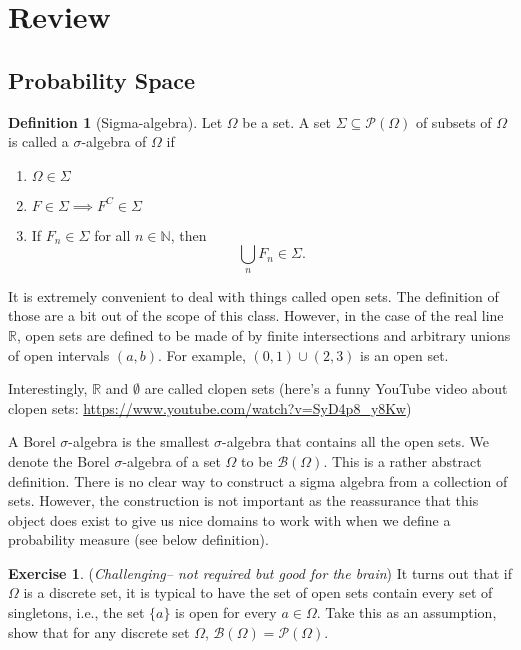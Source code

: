 \documentclass[
  openany]{book}
\theoremstyle{definition}
\newtheorem{definition}{Definition}[chapter]
\theoremstyle{definition}
\theoremstyle{definition}
\newtheorem{exercise}{Exercise}[chapter]
\theoremstyle{definition}
\theoremstyle{remark}
\begin{document}
\section{Review}\label{review}

\subsection{Probability Space}\label{probability-space}

\begin{definition}[Sigma-algebra]

Let \(\Omega\) be a set.
A set \(\Sigma \subseteq \mathcal{P}(\Omega)\) of subsets of \(\Omega\) is called a \(\sigma\)-algebra
of \(\Omega\) if

\begin{enumerate}
\def\labelenumi{\arabic{enumi}.}
\item
  \(\Omega\in \Sigma\)
\item
  \(F \in \Sigma \implies F^C \in \Sigma\)
\item
  If \(F_n \in \Sigma\) for all \(n\in \mathbb{N}\), then
  \[ \bigcup_n F_n \in \Sigma .\]
\end{enumerate}

\end{definition}

It is extremely convenient to deal with things called open sets.
The definition of those are a bit out of the scope of this class.
However,
in the case of the real line \(\mathbb{R}\), open sets are defined to be made of by finite intersections and arbitrary unions of open intervals \((a,b)\).
For example, \((0,1)\cup (2,3)\) is an open set.

Interestingly, \(\mathbb{R}\) and \(\emptyset\) are called clopen sets (here's a funny YouTube video about clopen sets: \url{https://www.youtube.com/watch?v=SyD4p8_y8Kw})

A Borel \(\sigma\)-algebra is the smallest \(\sigma\)-algebra that contains all the open sets.
We denote the Borel \(\sigma\)-algebra of a set \(\Omega\) to be \(\mathcal{B}(\Omega)\).
This is a rather abstract definition. There is no clear way to construct a sigma algebra from a collection of sets. However, the construction is not important as the reassurance that this object does exist to give us nice domains to work with when we define a probability measure (see below definition).

\begin{exercise}
(\emph{Challenging-- not required but good for the brain})
It turns out that if \(\Omega\) is a discrete set, it is typical to have the set of open sets contain every set of singletons, i.e.,
the set \(\{ a \}\) is open for every \(a\in \Omega\).
Take this as an assumption, show that
for any discrete set \(\Omega\), \(\mathcal{B}(\Omega) = \mathcal{P}(\Omega)\).
\end{exercise}
\end{document}
